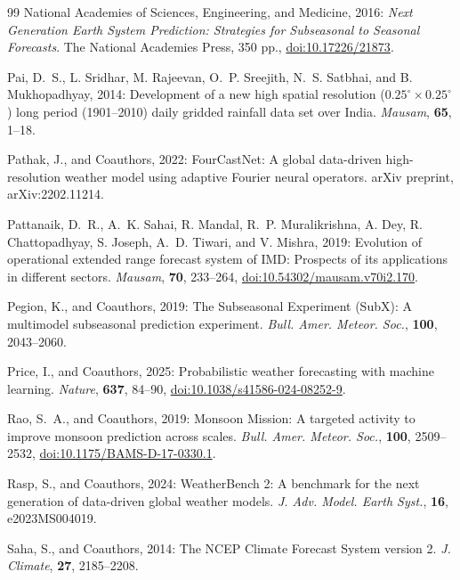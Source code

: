 \documentclass[11pt,a4paper]{article}
\providecommand{\doi}[1]{\href{https://doi.org/#1}{doi:#1}}
\begin{document}
\begin{thebibliography}{99}
National Academies of Sciences, Engineering, and Medicine, 2016:
\textit{Next Generation Earth System Prediction: Strategies for
Subseasonal to Seasonal Forecasts}. The National Academies Press,
350 pp., \doi{10.17226/21873}.

Pai, D.~S., L. Sridhar, M. Rajeevan, O.~P. Sreejith, N.~S. Satbhai,
and B. Mukhopadhyay, 2014: Development of a new high spatial
resolution ($0.25^{\circ} \times 0.25^{\circ}$) long period
(1901--2010) daily gridded rainfall data set over India.
\textit{Mausam}, \textbf{65}, 1--18.

Pathak, J., and Coauthors, 2022: FourCastNet: A global data-driven
high-resolution weather model using adaptive Fourier neural
operators. arXiv preprint, arXiv:2202.11214.

Pattanaik, D.~R., A.~K. Sahai, R. Mandal, R.~P. Muralikrishna,
A. Dey, R. Chattopadhyay, S. Joseph, A.~D. Tiwari, and V. Mishra,
2019: Evolution of operational extended range forecast system of IMD:
Prospects of its applications in different sectors.
\textit{Mausam}, \textbf{70}, 233--264,
\doi{10.54302/mausam.v70i2.170}.

Pegion, K., and Coauthors, 2019: The Subseasonal Experiment (SubX):
A multimodel subseasonal prediction experiment. \textit{Bull. Amer.
Meteor. Soc.}, \textbf{100}, 2043--2060.

Price, I., and Coauthors, 2025: Probabilistic weather forecasting
with machine learning. \textit{Nature}, \textbf{637}, 84--90,
\doi{10.1038/s41586-024-08252-9}.

Rao, S.~A., and Coauthors, 2019: Monsoon Mission: A targeted activity
to improve monsoon prediction across scales. \textit{Bull. Amer.
Meteor. Soc.}, \textbf{100}, 2509--2532,
\doi{10.1175/BAMS-D-17-0330.1}.

Rasp, S., and Coauthors, 2024: WeatherBench 2: A benchmark for the
next generation of data-driven global weather models. \textit{J. Adv.
Model. Earth Syst.}, \textbf{16}, e2023MS004019.

Saha, S., and Coauthors, 2014: The NCEP Climate Forecast System
version 2. \textit{J. Climate}, \textbf{27}, 2185--2208.


\end{thebibliography}
\end{document}
